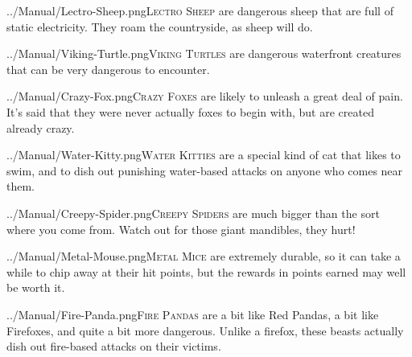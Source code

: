 \documentclass[10pt,twocolumn,openany,article]{memoir}
\begin{document}
\begin{description}
\vspace{14pt}

\lettrine[image=true,                lines=5,               findent=3pt,
nindent=3pt]{../Manual/Lectro-Sheep.png}{Lectro  Sheep}   are  dangerous
sheep that are full of static electricity. They roam the countryside, as
sheep will do.

\vspace{14pt}

\lettrine[image=true,                lines=5,               findent=3pt,
nindent=3pt]{../Manual/Viking-Turtle.png}{Viking Turtles}  are dangerous
waterfront creatures that can be very dangerous to encounter.

\vspace{14pt}

\lettrine[image=true,                lines=5,               findent=3pt,
nindent=3pt]{../Manual/Crazy-Fox.png}{Crazy Foxes} are likely to unleash
a great deal of  pain. It's said that they were  never actually foxes to
begin with, but are created already crazy.

\vspace{14pt}

\lettrine[image=true,                lines=5,               findent=3pt,
nindent=3pt]{../Manual/Water-Kitty.png}{Water  Kitties}  are  a  special
kind of  cat that likes to  swim, and to dish  out punishing water-based
attacks on anyone who comes near them.

\vspace{14pt}

\lettrine[image=true,                lines=5,               findent=3pt,
nindent=3pt]{../Manual/Creepy-Spider.png}{Creepy   Spiders}   are   much
bigger than  the sort  where you  come from. Watch  out for  those giant
mandibles, they hurt!

\vspace{14pt}

\lettrine[image=true,                lines=5,               findent=3pt,
nindent=3pt]{../Manual/Metal-Mouse.png}{Metal   Mice}    are   extremely
durable, so it  can take a while  to chip away at their  hit points, but
the rewards in points earned may well be worth it.

\vspace{14pt}

\lettrine[image=true,                lines=5,               findent=3pt,
nindent=3pt]{../Manual/Fire-Panda.png}{Fire Pandas}  are a bit  like Red
Pandas,  a  bit  like  Firefoxes,   and  quite  a  bit  more  dangerous.
Unlike a firefox,  these beasts actually dish out  fire-based attacks on
their victims.


\end{description}
\end{document}
